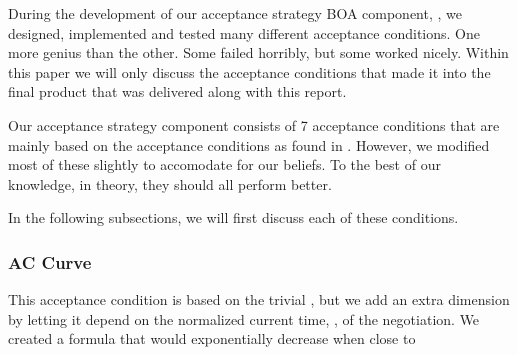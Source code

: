 During the development of our acceptance strategy BOA component, , we designed, implemented and tested many different acceptance conditions. One more genius than the other. Some failed horribly, but some worked nicely. Within this paper we will only discuss the acceptance conditions that made it into the final product that was delivered along with this report. 

Our acceptance strategy component consists of 7 acceptance conditions that are mainly based on the acceptance conditions as found in \cite{baarslag2013acceptance}. However, we modified most of these slightly to accomodate for our beliefs. To the best of our knowledge, in theory, they should all perform better.

In the following subsections, we will first discuss each of these conditions.

\subsubsection{AC Curve}
This acceptance condition is based on the trivial , but we add an extra dimension by letting it depend on the normalized current time, , of the negotiation. We created a formula that would exponentially decrease when  close to 